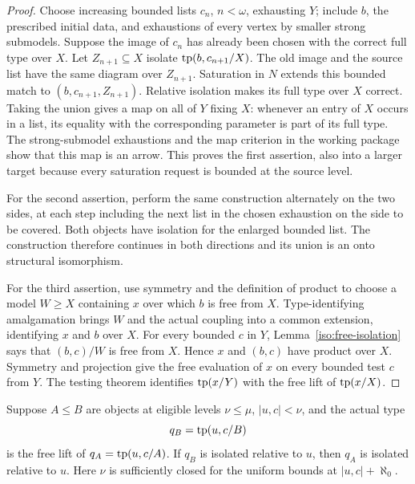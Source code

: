 \begin{proof}
Choose increasing bounded lists $c_n$, $n<\omega$, exhausting $Y$;
include $b$, the prescribed initial data, and exhaustions of every vertex
by smaller strong submodels. Suppose the image of $c_n$ has already been
chosen with the correct full type over $X$. Let $Z_{n+1}\subseteq X$
isolate $\operatorname{tp}(b,c_{n+1}/X)$. The old image and the source list have the
same diagram over $Z_{n+1}$. Saturation in $N$ extends this bounded match
to $(b,c_{n+1},Z_{n+1})$. Relative isolation makes its full type over $X$
correct. Taking the union gives a map on all of $Y$ fixing $X$: whenever
an entry of $X$ occurs in a list, its equality with the corresponding
parameter is part of its full type. The strong-submodel exhaustions and
the map criterion in the working package show that this map is an arrow.
This proves the first assertion, also into a larger target because every
saturation request is bounded at the source level.

For the second assertion, perform the same construction alternately on
the two sides, at each step including the next list in the chosen
exhaustion on the side to be covered. Both objects have isolation for
the enlarged bounded list. The construction therefore continues in both
directions and its union is an onto structural isomorphism.

For the third assertion, use symmetry and the definition of product to
choose a model $W\geq X$ containing $x$ over which $b$ is free from $X$.
Type-identifying amalgamation brings $W$ and the actual coupling into a
common extension, identifying $x$ and $b$ over $X$. For every bounded
$c$ in $Y$, Lemma~\ref{iso:free-isolation} says that $(b,c)/W$ is free
from $X$. Hence $x$ and $(b,c)$ have product over $X$. Symmetry and
projection give the free evaluation of $x$ on every bounded test $c$
from $Y$. The testing theorem identifies $\operatorname{tp}(x/Y)$ with the free lift
of $\operatorname{tp}(x/X)$.
\end{proof}

\begin{lemma}\label{iso:downward-transfer}
Suppose $A\leq B$ are objects at eligible levels $\nu\leq\mu$,
$|u,c|<\nu$, and the actual type
\[
 q_B=\operatorname{tp}(u,c/B)
\]
is the free lift of $q_A=\operatorname{tp}(u,c/A)$. If $q_B$ is isolated relative to
$u$, then $q_A$ is isolated relative to $u$. Here $\nu$ is sufficiently
closed for the uniform bounds at $|u,c|+\aleph_0$.
\end{lemma}

